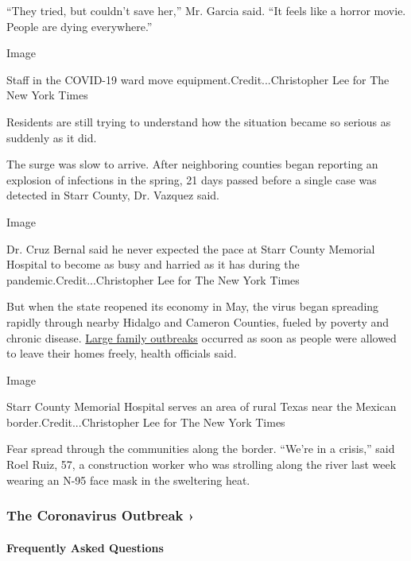 ``They tried, but couldn't save her,'' Mr. Garcia said. ``It feels like
a horror movie. People are dying everywhere.''

Image

Staff in the COVID-19 ward move equipment.Credit...Christopher Lee for
The New York Times

Residents are still trying to understand how the situation became so
serious as suddenly as it did.

The surge was slow to arrive. After neighboring counties began reporting
an explosion of infections in the spring, 21 days passed before a single
case was detected in Starr County, Dr. Vazquez said.

Image

Dr. Cruz Bernal said he never expected the pace at Starr County Memorial
Hospital to become as busy and harried as it has during the
pandemic.Credit...Christopher Lee for The New York Times

But when the state reopened its economy in May, the virus began
spreading rapidly through nearby Hidalgo and Cameron Counties, fueled by
poverty and chronic disease.
\href{https://www.nytimes.com/2020/07/14/us/coronavirus-texas-rio-grande-valley-border.html}{Large
family outbreaks} occurred as soon as people were allowed to leave their
homes freely, health officials said.

Image

Starr County Memorial Hospital serves an area of rural Texas near the
Mexican border.Credit...Christopher Lee for The New York Times

Fear spread through the communities along the border. ``We're in a
crisis,'' said Roel Ruiz, 57, a construction worker who was strolling
along the river last week wearing an N-95 face mask in the sweltering
heat.

\href{https://www.nytimes.com/news-event/coronavirus?action=click\&pgtype=Article\&state=default\&region=MAIN_CONTENT_3\&context=storylines_faq}{}

\hypertarget{the-coronavirus-outbreak-}{%
\subsubsection{The Coronavirus Outbreak
›}\label{the-coronavirus-outbreak-}}

\hypertarget{frequently-asked-questions}{%
\paragraph{Frequently Asked
Questions}\label{frequently-asked-questions}}


